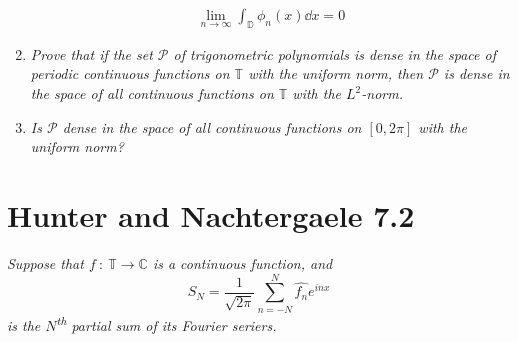 \documentclass[12pt]{article}
\theoremstyle{plain}
\begin{document}
\begin{enumerate}[\bf (a)]
        \begin{align*}
            \lim_{n\rightarrow \infty}\int_\mathbb{D}\phi_n(x) \dd x = 0
        \end{align*}
    \item
        \emph{Prove that if the set $\mathcal{P}$ of trigonometric polynomials is dense in the space of periodic continuous functions on $\mathbb{T}$ with the uniform norm, then $\mathcal{P}$ is dense in the space of all continuous functions on $\mathbb{T}$ with the $L^2$-norm.}
    \item
        \emph{Is $\mathcal{P}$ dense in the space of all continuous functions on $[0, 2\pi]$ with the uniform norm?}
\end{enumerate}

\section*{Hunter and Nachtergaele 7.2}
\emph{Suppose that $f\ :\ \mathbb{T} \rightarrow \mathbb{C}$ is a continuous function, and $$S_N = \frac{1}{\sqrt{2\pi}}\sum_{n=-N}^N \hat{f_n}e^{inx}$$ is the $N$\textsuperscript{th} partial sum of its Fourier seriers.}
\end{document}
